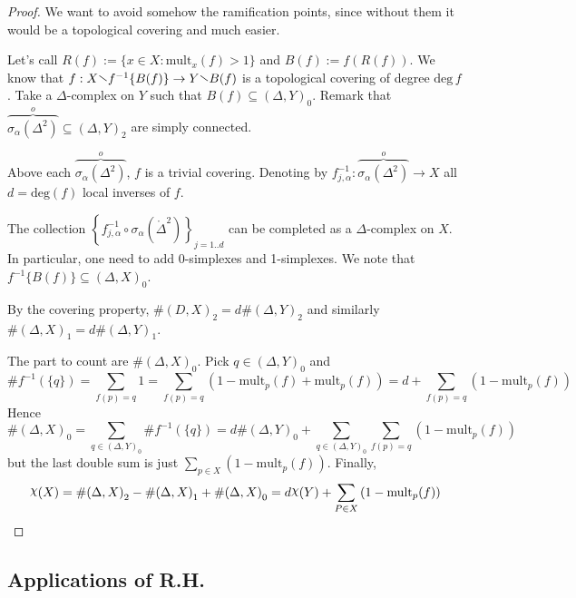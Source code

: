 \begin{proof}{}
    We want to avoid somehow the ramification points, since without them it
    would be a topological covering and much easier. 

    Let's call \(R{(f)} := \{x \in X : \mathrm{mult}_x{(f)} > 1\} \) and \(B{(f)}
    := f{(R{(f)})}\).
    We know that \(f : X \sminus f^{-1}\{B{(f)}\} \to Y \sminus B{(f)}\) is a
    topological covering of degree \(\mathrm{deg}\,f\). Take a
    \(\Delta\)-complex on \(Y\) such that \(B{(f)} \subseteq {(\Delta, Y)}_0 \).
    Remark that \(\overbrace{\sigma_{\alpha} {\left( \Delta^2 \right)} }^{o}
    \subseteq {(\Delta, Y)}_2 \) are simply connected.

    Above each \(\overbrace{\sigma_{\alpha} {\left( \Delta^2 \right)} }^{o}\),
    \(f\) is a trivial covering. Denoting by \(f^{-1}_{j,\alpha} :
    \overbrace{\sigma_{\alpha} {\left( \Delta^2 \right)}}^{o} \to X\) all \(d =
    \mathrm{deg}{(f)}\) local inverses of \(f\).

    The collection \(\left\{f_{j,\alpha} ^{-1} \circ \sigma_{\alpha} {\left(
    \mathring{\Delta}^2 \right)} \right\}_{j=1. .d}  \) can be completed as a
    \(\Delta\)-complex on \(X\). In particular, one need to add 0-simplexes and
    1-simplexes. We note that \(f^{-1}\{B{(f)}\} \subseteq {(\Delta, X)}_0 \).

    By the covering property, \(\# {(D, X)}_2 = d \# {(\Delta, Y)}_2\) and
    similarly \(\# {(\Delta, X)}_1 = d \# {(\Delta, Y)}_1\).

    The part to count are \(\# {(\Delta, X)}_0\). Pick \(q \in  {(\Delta,
    Y)}_0\) and \[\# f^{-1}{(\{q\} )} = \sum_{f{(p)} = q} 1 = \sum_{f(p) = q}
    {\left( 1 - \mathrm{mult}_{p} {(f)} + \mathrm{mult}_p {(f)} \right)} = d +
\sum_{f{(p)} = q} {\left( 1 - \mathrm{mult}_p{(f)} \right)}   \]
    Hence 
    \[
      \# {(\Delta, X)}_0 = \sum_{q \in  {(\Delta, Y)}_0} \# f^{-1}{(\{q\} )} = d
      \# {(\Delta, Y)}_0 + \sum_{q \in {(\Delta, Y)}_0} \sum_{f{(p)} = q}
      {\left( 1 - \mathrm{mult}_p{(f)} \right)}
    \]
    but the last double sum is just \(\sum_{p \in X} {\left( 1 - \mathrm{mult}_p
    {(f)}\right)} \). Finally,
    \[
      \rchi {(X)} = \# {(\Delta, X)}_2 - \# {(\Delta, X)}_1 + \# {(\Delta, X)}_0
      = d \rchi{(Y)} + \sum_{P \in X} {\left( 1 - \mathrm{mult}_p {(f)} \right)} 
    \]
\end{proof}

\subsection{Applications of R.H.}

